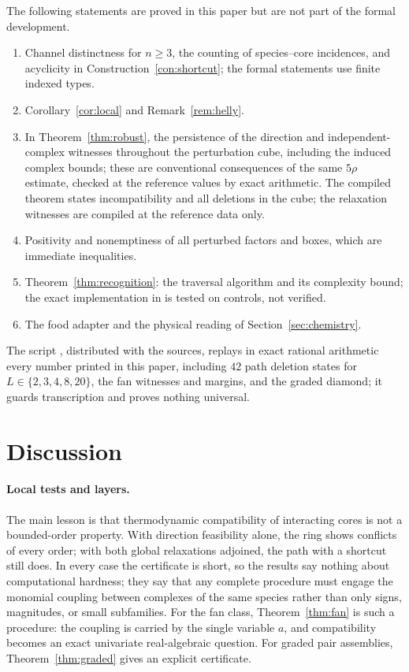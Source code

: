 \documentclass[11pt,a4paper]{article}
\theoremstyle{plain}
\theoremstyle{definition}
\theoremstyle{remark}
\begin{document}
The following statements are proved in this paper but are not part of the formal development.
\begin{enumerate}
\item Channel distinctness for $n\ge3$, the counting of species--core incidences, and acyclicity in Construction~\ref{con:shortcut}; the formal statements use finite indexed types.
\item Corollary~\ref{cor:local} and Remark~\ref{rem:helly}.
\item In Theorem~\ref{thm:robust}, the persistence of the direction and independent-complex witnesses throughout the perturbation cube, including the induced complex bounds; these are conventional consequences of the same $5\rho$ estimate, checked at the reference values by exact arithmetic. The compiled theorem  states incompatibility and all deletions in the cube; the relaxation witnesses are compiled at the reference data only.
\item Positivity and nonemptiness of all perturbed factors and boxes, which are immediate inequalities.
\item Theorem~\ref{thm:recognition}: the traversal algorithm and its complexity bound; the exact implementation in  is tested on controls, not verified.
\item The food adapter and the physical reading of Section~\ref{sec:chemistry}.
\end{enumerate}
The script , distributed with the sources, replays in exact rational arithmetic every number printed in this paper, including $42$ path deletion states for $L\in\{2,3,4,8,20\}$, the fan witnesses and margins, and the graded diamond; it guards transcription and proves nothing universal.

\section{Discussion}\label{sec:discussion}

\paragraph{Local tests and layers.} The main lesson is that thermodynamic compatibility of interacting cores is not a bounded-order property. With direction feasibility alone, the ring shows conflicts of every order; with both global relaxations adjoined, the path with a shortcut still does. In every case the certificate is short, so the results say nothing about computational hardness; they say that any complete procedure must engage the monomial coupling between complexes of the same species rather than only signs, magnitudes, or small subfamilies. For the fan class, Theorem~\ref{thm:fan} is such a procedure: the coupling is carried by the single variable $a$, and compatibility becomes an exact univariate real-algebraic question. For graded pair assemblies, Theorem~\ref{thm:graded} gives an explicit certificate.
\end{document}
